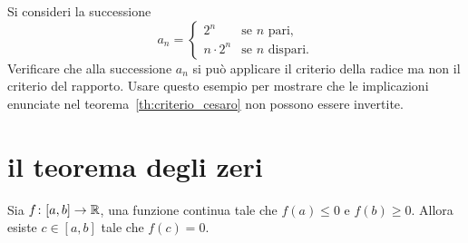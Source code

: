  \begin{exercise}
 Si consideri la successione
 \[
 a_n =
 \begin{cases}
    2^n &\text{se $n$ pari},\\
    n\cdot 2^n &\text{se $n$ dispari}.
 \end{cases}
 \]
 Verificare che alla successione $a_n$
  si può applicare il criterio della radice ma
  non il criterio del rapporto.
  Usare questo esempio per mostrare che le implicazioni
  enunciate nel teorema~\ref{th:criterio_cesaro} non
  possono essere invertite.
  \end{exercise}  

\section{il teorema degli zeri}

\begin{theorem}
\mymark{***}%
%
%
\label{th:zeri}%
Sia $f\colon[a,b] \to {\mathbb R}$, una funzione
continua tale che $f(a)\le 0$ e $f(b)\ge 0$.
Allora esiste
 $c\in [a,b]$ tale che $f(c)=0$.
\end{theorem}

